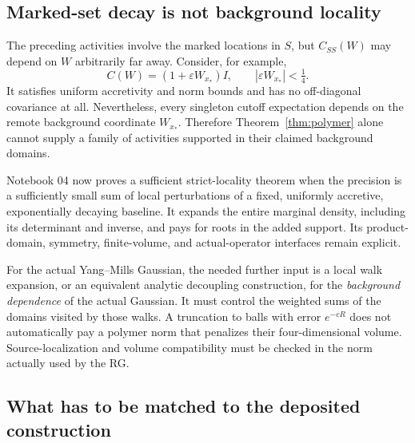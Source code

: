 \documentclass[11pt]{article}
\theoremstyle{remark}
\begin{document}
\subsection{Marked-set decay is not background locality}

The preceding activities involve the marked locations in $S$, but
$C_{SS}(W)$ may depend on $W$ arbitrarily far away. Consider, for
example,
\[
 C(W)=(1+\varepsilon W_{x_*})I,\qquad
 |\varepsilon W_{x_*}|<\tfrac14.
\]
It satisfies uniform accretivity and norm bounds and has no
off-diagonal covariance at all. Nevertheless, every singleton cutoff
expectation depends on the remote background coordinate $W_{x_*}$.
Therefore Theorem~\ref{thm:polymer} alone cannot supply a family of
activities supported in their claimed background domains.

Notebook 04 now proves a sufficient strict-locality theorem when the
precision is a sufficiently small sum of local perturbations of a fixed,
uniformly accretive, exponentially decaying baseline. It expands the
entire marginal density, including its determinant and inverse, and
pays for roots in the added support. Its product-domain, symmetry,
finite-volume, and actual-operator interfaces remain explicit.

For the actual Yang--Mills Gaussian, the needed further input is a
local walk expansion, or an equivalent
analytic decoupling construction, for the \emph{background dependence}
of the actual Gaussian. It must control the weighted sums of the
domains visited by those walks. A truncation to balls with error
$e^{-cR}$ does not automatically pay a polymer norm that penalizes
their four-dimensional volume. Source-localization and volume
compatibility must be checked in the norm actually used by the RG.

\subsection{What has to be matched to the deposited construction}
\end{document}
